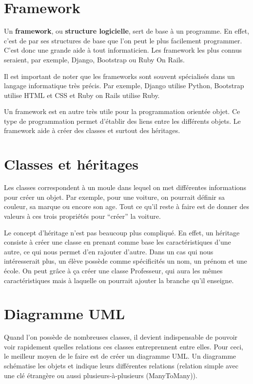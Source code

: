 \documentclass[letterpaper,10pt,french]{sphinxmanual}
\begin{document}
\section{Framework}
\label{introduction:framework}
Un \textbf{framework}, ou \textbf{structure logicielle}, sert de base à un programme.
En effet, c'est de par ses structures de base que l'on peut le plus facilement
programmer. C'est donc une grande aide à tout informaticien. Les framework les
plus connus seraient, par exemple, Django, Bootstrap ou Ruby On Rails.

Il est important de noter que les frameworks sont souvent spécialisés dans un
langage informatique très précis. Par exemple, Django utilise Python, Bootstrap
utilise HTML et CSS et Ruby on Rails utilise Ruby.

Un framework est en autre très utile pour la programmation orientée objet. Ce
type de programmation permet d'établir des liens entre les différents objets.
Le framework aide à créer des classes et surtout des héritages.


\section{Classes et héritages}
\label{introduction:classes-et-heritages}
Les classes correspondent à un moule dans lequel on met différentes
informations pour créer un objet. Par exemple, pour une voiture, on pourrait
définir sa couleur, sa marque ou encore son age. Tout ce qu'il reste à faire
est de donner des valeurs à ces trois propriétés pour ``créer'' la voiture.

Le concept d'héritage n'est pas beaucoup plus compliqué. En effet, un héritage
consiste à créer une classe en prenant comme base les caractéristiques d'une
autre, ce qui nous permet d'en rajouter d'autre. Dans un cas qui nous
intéresserait plus, un élève possède comme spécificités un nom, un prénom et
une école. On peut grâce à ça créer une classe Professeur, qui aura les
mêmes caractéristiques mais à laquelle on pourrait ajouter la branche qu'il
enseigne.


\section{Diagramme UML}
\label{introduction:diagramme-uml}
Quand l'on possède de nombreuses classes, il devient indispensable de pouvoir
voir rapidement quelles relations ces classes entreprennent entre elles. Pour
ceci, le meilleur moyen de le faire est de créer un diagramme UML. Un diagramme
schématise les objets et indique leurs différentes relations (relation simple
avec une clé étrangère ou aussi plusieurs-à-plusieurs (ManyToMany)).
\end{document}
